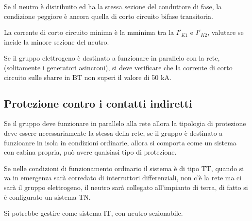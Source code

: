 Se il neutro è distribuito ed ha la stessa sezione del conduttore di fase, la 
condizione peggiore è ancora quella di corto circuito bifase transitoria.

La corrente di corto circuito minima è la mminima tra la $I'_{K1}$ e $I'_{K2}$, valutare se incide la minore sezione del neutro.

Se il gruppo elettrogeno è destinato a funzionare in parallelo con la rete, (solitamente i generatori asincroni), si deve verificare che la corrente di corto circuito sulle sbarre in BT non superi il valore di 50 kA.

\subsection{Protezione contro i contatti indiretti}
Se il gruppo deve funzionare in parallelo alla rete allora la tipologia di 
protezione deve essere necessariamente la stessa della rete, se il gruppo è 
destinato a funzioanre in isola in condizioni ordinarie, allora si comporta 
come un sistema con cabina propria, può avere qualsiasi tipo di protezione.

Se nelle condizioni di funzionamento ordinario il sistema è di tipo TT, quando 
si va in emergenza sarà corredato di interruttori differenziali, non c'è la 
rete ma ci sarà il gruppo elettrogeno, il neutro sarà collegato all'impianto di 
terra, di fatto si è configurato un sistema TN.

Si potrebbe gestire come sistema IT, con neutro sezionabile.

